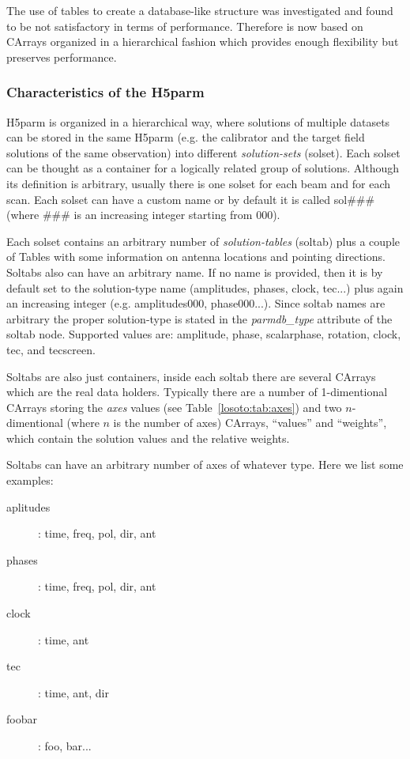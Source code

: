 \documentclass[structabstract]{article}
\begin{document}
The use of tables to create a database-like structure was investigated and found to be not satisfactory in terms of performance. Therefore \losoto{} is now based on CArrays organized in a hierarchical fashion which provides enough flexibility but preserves performance.

\subsubsection{Characteristics of the H5parm}
\label{losoto:characteristics_h5parm}

H5parm is organized in a hierarchical way, where solutions of multiple datasets can be stored in the same H5parm (e.g. the calibrator and the target field solutions of the same observation) into different \textit{solution-sets} (solset). Each solset can be thought as a container for a logically related group of solutions. Although its definition is arbitrary, usually there is one solset for each beam and for each scan. Each solset can have a custom name or by default it is called sol\#\#\# (where \#\#\# is an increasing integer starting from 000).

Each solset contains an arbitrary number of \textit{solution-tables} (soltab) plus a couple of Tables with some information on antenna locations and pointing directions. Soltabs also can have an arbitrary name. If no name is provided, then it is by default set to the solution-type name (amplitudes, phases, clock, tec...) plus again an increasing integer (e.g. amplitudes000, phase000...). Since soltab names are arbitrary the proper solution-type is stated in the \textit{parmdb\_type} attribute of the soltab node. Supported values are: amplitude, phase, scalarphase, rotation, clock, tec, and tecscreen.

Soltabs are also just containers, inside each soltab there are several CArrays which are the real data holders. Typically there are a number of 1-dimentional CArrays storing the \textit{axes} values (see Table~\ref{losoto:tab:axes}) and two $n$-dimentional (where $n$ is the number of axes) CArrays, ``values'' and ``weights'', which contain the solution values and the relative weights.

Soltabs can have an arbitrary number of axes of whatever type. Here we list some examples:
\begin{description}
 \item[aplitudes]: time, freq, pol, dir, ant
 \item[phases]: time, freq, pol, dir, ant
 \item[clock]: time, ant
 \item[tec]: time, ant, dir
 \item[foobar]: foo, bar...
\end{description}
\end{document}
